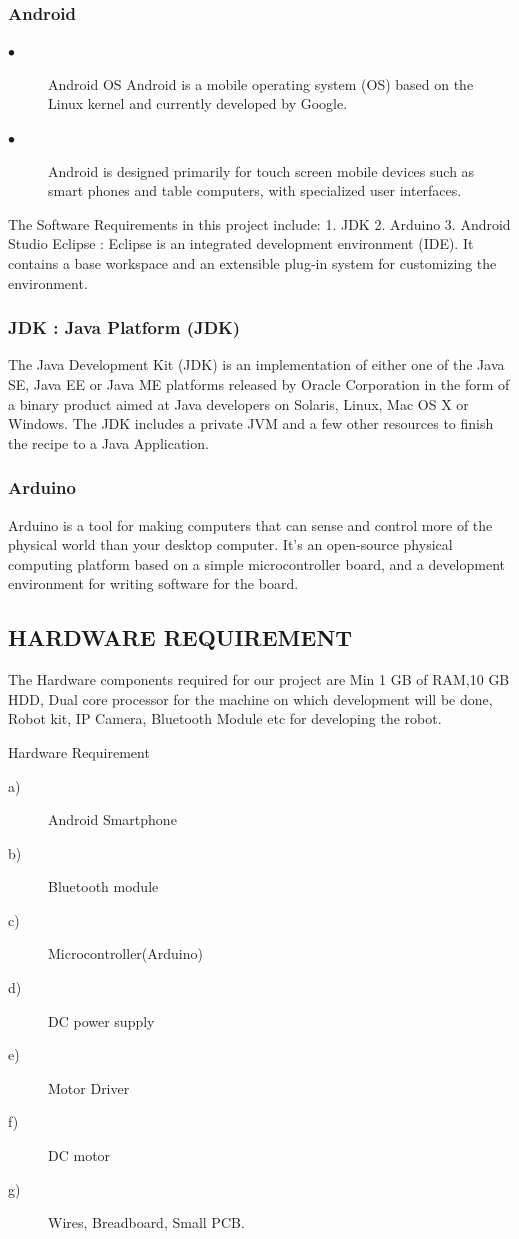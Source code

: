 \documentclass[sigconf]{acmart}
\begin{document}
\subsubsection{Android}
\begin{description}
\item[$\bullet$] Android OS Android is a mobile operating system (OS) based on the Linux kernel and currently developed by Google.
\item[$\bullet$] Android is designed primarily for touch screen mobile devices such as smart phones and table computers, with specialized user interfaces.
\end{description}

The Software Requirements in this project include:
1. JDK
2. Arduino
3. Android Studio
Eclipse :
Eclipse is an integrated development
environment (IDE). It contains a base workspace and an
extensible plug-in system for customizing the environment.

\subsubsection{JDK : Java Platform (JDK)}
The Java Development Kit (JDK) is an implementation
of either one of the Java SE, Java EE or Java ME platforms released by Oracle Corporation in the form of a binary product aimed at Java developers on Solaris, Linux, Mac OS X or Windows.
The JDK includes a private JVM and a few other
resources to finish the recipe to a Java Application.

\subsubsection{Arduino}
Arduino is a tool for making computers that can sense and control more of the physical world than your desktop computer. It’s an open-source physical computing platform based on a simple microcontroller board, and a development environment for writing software for the board.

\subsection{HARDWARE REQUIREMENT}
The Hardware components required for our project are Min 1 GB of RAM,10 GB HDD, Dual core processor for the machine on which development will be done, Robot kit, IP Camera, Bluetooth Module etc for developing the robot.

Hardware Requirement
\begin{description}
\item[a)] Android Smartphone
\item[b)] Bluetooth module
\item[c)] Microcontroller(Arduino)
\item[d)] DC power supply
\item[e)] Motor Driver
\item[f)] DC motor
\item[g)] Wires, Breadboard, Small PCB.
\end{description}
\end{document}
